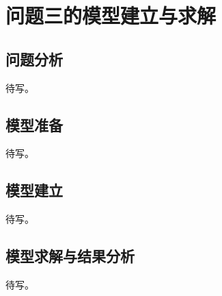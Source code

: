 \section{问题三的模型建立与求解}
\subsection{问题分析}
待写。

\subsection{模型准备}
待写。

\subsection{模型建立}
待写。

\subsection{模型求解与结果分析}
待写。
